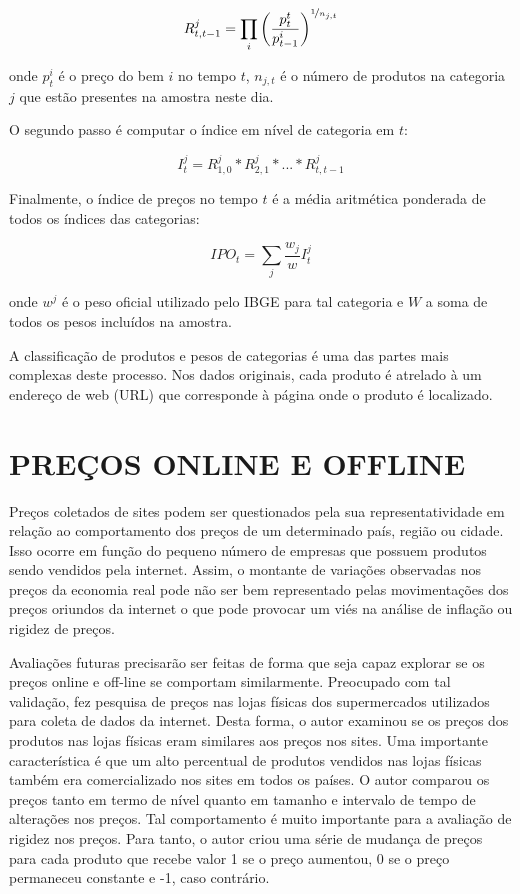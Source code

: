 \documentclass[twoside,a4paper,11pt]{report}
\begin{document}
\begin{equation}
R_{t,t-1}^{j}=\prod_{i}\left(\frac{p_{t}^{t}}{p_{t-1}^{i}}\right)^{\nicefrac{1}{n_{j,t}}}
\end{equation}

\noindent onde $p_{t}^{i}$ é o preço do bem $i$ no tempo $t$, $n_{j,t}$ é o número de produtos na categoria $j$ que estão presentes na amostra neste dia. 

O segundo passo é computar o índice em nível de categoria em $t$:

\begin{equation}\label{eq2}
I_{t}^{j}=R_{1,0}^{j}\ast{R}_{2,1}^{j}\ast{...}\ast{R}_{t,t-1}^{j}
\end{equation}

Finalmente, o índice de preços no tempo $t$ é a média aritmética ponderada de todos os índices das categorias:

\begin{equation}
IPO_{t}=\sum_{j}{\frac{w_{j}}{w}I_{t}^{j}} 
\end{equation}

\noindent onde $w^{j}$ é o peso oficial utilizado pelo IBGE para tal categoria e $W$ a soma de todos os pesos incluídos na amostra.

A classificação de produtos e pesos de categorias é uma das partes mais complexas deste processo. Nos dados originais, cada produto é atrelado à um endereço de web (URL) que corresponde à página onde o produto é localizado. 

\section*{PREÇOS ONLINE E OFFLINE}

Preços coletados de sites podem ser questionados pela sua representatividade em relação ao comportamento dos preços de um determinado país, região ou cidade. Isso ocorre em função do pequeno número de empresas que possuem produtos sendo vendidos pela internet. Assim, o montante de variações observadas nos preços da economia real pode não ser bem representado pelas movimentações dos preços oriundos da internet o que pode provocar um viés na análise de inflação ou rigidez de preços. 

  Avaliações futuras precisarão ser feitas de forma que seja capaz explorar se os preços online e off-line se comportam similarmente. Preocupado com tal validação, \citet{cavallo2010scraped} fez pesquisa de preços nas lojas físicas dos supermercados utilizados para coleta de dados da internet. Desta forma, o autor examinou se os preços dos produtos nas lojas físicas eram similares aos preços nos sites. Uma importante característica é que um alto percentual de produtos vendidos nas lojas físicas também era comercializado nos sites em todos os países. O autor comparou os preços tanto em termo de nível quanto em tamanho e intervalo de tempo de alterações nos preços. Tal comportamento é muito importante para a avaliação de rigidez nos preços. Para tanto, o autor criou uma série de mudança de preços para cada produto que recebe valor 1 se o preço aumentou, 0 se o preço permaneceu constante e -1, caso contrário. 
  
\end{document}
